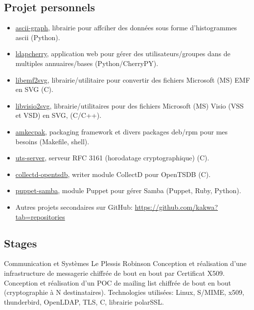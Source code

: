 \documentclass[10pt,a4paper,sans]{moderncv}        %
\begin{document}
\subsection{Projet personnels}
        {}
        {}
        {}
        {
            \begin{itemize}
            \item \href{https://github.com/kakwa/py-ascii-graph}{ascii-graph}, librairie pour affciher des données sous forme d'histogrammes ascii (Python).
            \item \href{https://github.com/kakwa/ldapcherry}{ldapcherry}, application web pour gérer des utilisateurs/groupes dans de multiples annuaires/bases (Python/CherryPY).
            \item \href{https://github.com/kakwa/libemf2svg}{libemf2svg}, librairie/utilitaire pour convertir des fichiers Microsoft (MS) EMF en SVG (C).
            \item \href{https://github.com/kakwa/libvisio2svg}{libvisio2svg}, librairie/utilitaires pour des fichiers Microsoft (MS) Visio (VSS et VSD) en SVG, (C/C++).
            \item \href{https://github.com/kakwa/amkecpak}{amkecpak}, packaging framework et divers packages deb/rpm pour mes besoins (Makefile, shell).
            \item \href{https://github.com/kakwa/uts-server}{uts-server}, serveur RFC 3161 (horodatage cryptographique) (C).
            \item \href{https://github.com/kakwa/collectd-opentsdb}{collectd-opentsdb}, writer module CollectD pour OpenTSDB (C).
            \item \href{https://github.com/kakwa/puppet-samba}{puppet-samba}, module Puppet pour gérer Samba (Puppet, Ruby, Python).
            \item Autres projets secondaires sur GitHub: \url{https://github.com/kakwa?tab=repositories}
            \end{itemize}
        }

\subsection{Stages}

        {Communication et Systèmes}
        {Le Plessis Robinson}
        {}
        {Conception et réalisation d'une infrastructure de messagerie chiffrée de bout en bout par
         Certificat X509. Conception et réalisation d'un POC de mailing list chiffrée de bout en bout
         (cryptographie à N destinataires).
         \newline Technologies utilisées: Linux, S/MIME, x509, thunderbird, OpenLDAP, TLS, C, librairie polarSSL.
        }
\end{document}
